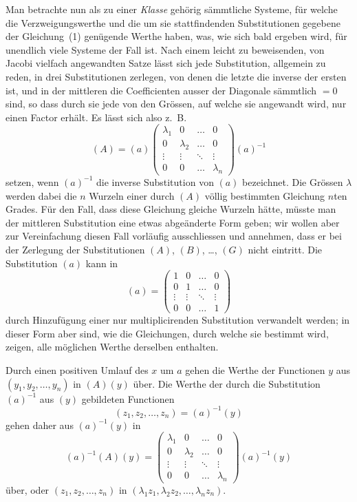 \documentclass[12pt,a4paper]{article}
\begin{document}
Man betrachte nun als zu einer \emph{Klasse} geh\"orig s\"ammtliche Systeme, f\"ur welche die Verzweigungswerthe und die um sie stattfindenden Substitutionen gegebene der Gleichung~(1) gen\"ugende Werthe haben, was, wie sich bald ergeben wird, f\"ur unendlich viele Systeme der Fall ist. Nach einem leicht zu beweisenden, von Jacobi vielfach angewandten Satze l\"asst sich jede Substitution, allgemein zu reden, in drei Substitutionen zerlegen, von denen die letzte die inverse der ersten ist, und in der mittleren die Coefficienten ausser der Diagonale s\"ammtlich $=0$ sind, so dass durch sie jede von den Gr\"ossen, auf welche sie angewandt wird, nur einen Factor erh\"alt. Es l\"asst sich also z.~B.
\[
(A) = (a)
\begin{pmatrix}
\lambda_1 & 0 & \ldots & 0 \\
0 & \lambda_2 & \ldots & 0 \\
\vdots & \vdots & \ddots & \vdots \\
0 & 0 & \ldots & \lambda_n
\end{pmatrix}
(a)^{-1}
\]
setzen, wenn $(a)^{-1}$ die inverse Substitution von $(a)$ bezeichnet. Die Gr\"ossen $\lambda$ werden dabei die $n$ Wurzeln einer durch $(A)$ v\"ollig bestimmten Gleichung $n$ten Grades. F\"ur den Fall, dass diese Gleichung gleiche Wurzeln h\"atte, m\"usste man der mittleren Substitution eine etwas abge\"anderte Form geben; wir wollen aber zur Vereinfachung diesen Fall vorl\"aufig ausschliessen und annehmen, dass er bei der Zerlegung der Substitutionen $(A)$, $(B)$, \ldots, $(G)$ nicht eintritt. Die Substitution $(a)$ kann in
\[
(a) =
\begin{pmatrix}
1 & 0 & \ldots & 0 \\
0 & 1 & \ldots & 0 \\
\vdots & \vdots & \ddots & \vdots \\
0 & 0 & \ldots & 1
\end{pmatrix}
\]
durch Hinzuf\"ugung einer nur multiplicirenden Substitution verwandelt werden; in dieser Form aber sind, wie die Gleichungen, durch welche sie bestimmt wird, zeigen, alle m\"oglichen Werthe derselben enthalten.

Durch einen positiven Umlauf des $x$ um $a$ gehen die Werthe der Functionen $y$ aus $(y_1, y_2, \ldots, y_n)$ in $(A)(y)$ \"uber. Die Werthe der durch die Substitution $(a)^{-1}$ aus $(y)$ gebildeten Functionen
\[
(z_1, z_2, \ldots, z_n) = (a)^{-1}(y)
\]
gehen daher aus $(a)^{-1}(y)$ in
\[
(a)^{-1}(A)(y) =
\begin{pmatrix}
\lambda_1 & 0 & \ldots & 0 \\
0 & \lambda_2 & \ldots & 0 \\
\vdots & \vdots & \ddots & \vdots \\
0 & 0 & \ldots & \lambda_n
\end{pmatrix}
(a)^{-1}(y)
\]
\"uber, oder $(z_1, z_2, \ldots, z_n)$ in $(\lambda_1 z_1, \lambda_2 z_2, \ldots, \lambda_n z_n)$.
\end{document}
